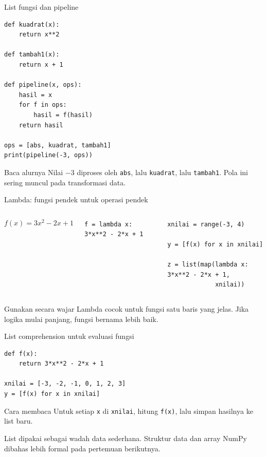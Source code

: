\documentclass[aspectratio=169,11pt]{beamer}
\begin{document}
\begin{frame}[fragile]{List fungsi dan pipeline}
\begin{lstlisting}
def kuadrat(x):
    return x**2

def tambah1(x):
    return x + 1

def pipeline(x, ops):
    hasil = x
    for f in ops:
        hasil = f(hasil)
    return hasil

ops = [abs, kuadrat, tambah1]
print(pipeline(-3, ops))
\end{lstlisting}
\begin{block}{Baca alurnya}
Nilai $-3$ diproses oleh \texttt{abs}, lalu \texttt{kuadrat}, lalu \texttt{tambah1}. Pola ini sering muncul pada transformasi data.
\end{block}
\end{frame}

\begin{frame}[fragile]{Lambda: fungsi pendek untuk operasi pendek}
\begin{columns}[T]
\[
f(x)=3x^2-2x+1
\]
\begin{lstlisting}
f = lambda x: 3*x**2 - 2*x + 1
\end{lstlisting}
\begin{lstlisting}
xnilai = range(-3, 4)

y = [f(x) for x in xnilai]

z = list(map(lambda x: 3*x**2 - 2*x + 1,
             xnilai))
\end{lstlisting}
\end{columns}
\begin{block}{Gunakan secara wajar}
Lambda cocok untuk fungsi satu baris yang jelas. Jika logika mulai panjang, fungsi bernama lebih baik.
\end{block}
\end{frame}

\begin{frame}[fragile]{List comprehension untuk evaluasi fungsi}
\begin{lstlisting}
def f(x):
    return 3*x**2 - 2*x + 1

xnilai = [-3, -2, -1, 0, 1, 2, 3]
y = [f(x) for x in xnilai]
\end{lstlisting}
\begin{block}{Cara membaca}
Untuk setiap \texttt{x} di \texttt{xnilai}, hitung \texttt{f(x)}, lalu simpan hasilnya ke list baru.
\end{block}
\colorbox{LightTeal}{\parbox{.96\linewidth}{\small List dipakai sebagai wadah data sederhana. Struktur data dan array NumPy dibahas lebih formal pada pertemuan berikutnya.}}
\end{frame}
\end{document}
